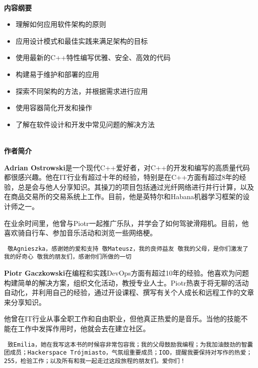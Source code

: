 \documentclass[11pt,a4paper,UTF8]{book}
\begin{document}
	\hspace*{\fill} \\ %
	\noindent\textbf{内容纲要}
	\begin{itemize}
		\item 理解如何应用软件架构的原则
		\item 应用设计模式和最佳实践来满足架构的目标
		\item 使用最新的C++特性编写优雅、安全、高效的代码
		\item 构建易于维护和部署的应用
		\item 探索不同架构的方法，并根据需求进行应用
		\item 使用容器简化开发和操作
		\item 了解在软件设计和开发中常见问题的解决方法
	\end{itemize}
	
	\hspace*{\fill} \\ %
	\noindent\textbf{作者简介}
	
	\textbf{Adrian Ostrowski}是一个现代C++爱好者，对C++的开发和编写的高质量代码都很感兴趣。他在IT行业有超过十年的经验，特别是在C++方面有超过8年的经验，总是会与他人分享知识。其操刀的项目包括通过光纤网络进行并行计算，以及在商品交易所的交易系统上工作。目前，他是英特尔和Habana机器学习框架的设计师之一。
	
	在业余时间里，他曾与Piotr一起推广乐队，并学会了如何驾驶滑翔机。目前，他喜欢骑自行车、参加音乐活动和浏览一些网络梗。
	
	\begin{center}
	\tt
	敬Agnieszka，感谢她的爱和支持
	敬Mateusz，我的良师益友
	敬我的父母，是你们激发了我的好奇心
	敬我的朋友们，感谢你们所做的一切
	\end{center}

	\textbf{Piotr Gaczkowski}在编程和实践DevOps方面有超过10年的经验。他喜欢为问题构建简单的解决方案，组织文化活动，教授专业人士。Piotr热衷于将无聊的活动自动化，并利用自己的经验，通过开设课程、撰写有关个人成长和远程工作的文章来分享知识。
	
	他曾在IT行业从事全职工作和自由职业，但他真正热爱的是音乐。当他的技能不能在工作中发挥作用时，他就会去在建立社区。
	
	\begin{center}
	\tt
	致Emilia，她在我写这本书的时候容非常包容我；我的父母鼓励我编程；为我加油鼓劲的智囊团成员；Hackerspace Trójmiasto，气氛组重要成员；IOD，提醒我要保持对写作的热爱；255，检验工作；以及所有和我一起走过这段旅程的朋友们。爱你们！
	\end{center}
	
\end{document}
